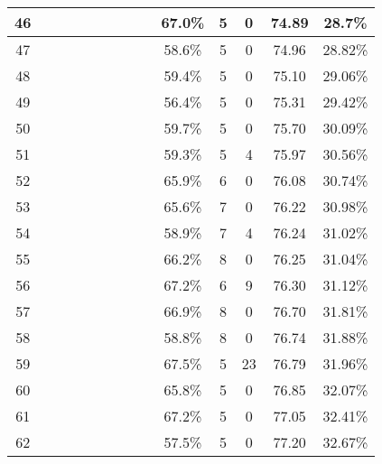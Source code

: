 \begin{longtable}{|c|c|c|c|c|c|c|c|c|c|c|c|c|c|}
46 &  \x    & \x    & \x    & \x    & \x\m  & \x    &       &       & 67.0\% &  5  & 0  & 74.89 & 28.7\% \\ \hline
47 &  \x    & \x    & \x    &       & \x    &       & \x    &       & 58.6\% &  5  & 0  & 74.96 & 28.82\% \\ \hline
48 &  \x    & \x    & \x    & \x    & \x    & \x    & \x    &       & 59.4\% &  5  & 0  & 75.10 & 29.06\% \\ \hline
49 &  \x    & \x    &       & \x    & \x    &       &       & \x    & 56.4\% &  5  & 0  & 75.31 & 29.42\% \\ \hline
50 &  \x    & \x    & \x    & \x    & \x    & \x    & \x\m  &       & 59.7\% &  5  & 0  & 75.70 & 30.09\% \\ \hline
51 &  \x    & \x    & \x    & \x    & \x    &       &       & \x\m  & 59.3\% &  5  & 4  & 75.97 & 30.56\% \\ \hline
52 &  \x    & \x    &       & \x    & \x\m  &       & \x\m  &       & 65.9\% &  6  & 0  & 76.08 & 30.74\% \\ \hline
53 &  \x    & \x    &       & \x    & \x\m  & \x\m  & \x\m  &       & 65.6\% &  7  & 0  & 76.22 & 30.98\% \\ \hline
54 &  \x    & \x    & \x    &       & \x    & \x\m  & \x    &       & 58.9\% &  7  & 4  & 76.24 & 31.02\% \\ \hline
55 &  \x    & \x    & \x    &       & \x\m  &       &       & \x\m  & 66.2\% &  8  & 0  & 76.25 & 31.04\% \\ \hline
56 &  \x    & \x    &       &       & \x\m  &       &       & \x\m  & 67.2\% &  6  & 9  & 76.30 & 31.12\% \\ \hline
57 &  \x    & \x    &       &       & \x\m  & \x\m  &       & \x\m  & 66.9\% &  8  & 0  & 76.70 & 31.81\% \\ \hline
58 &  \x    & \x    & \x    & \x    &       &       &       &       & 58.8\% &  8  & 0  & 76.74 & 31.88\% \\ \hline
59 &  \x    & \x    &       &       & \x\m  &       &       &       & 67.5\% &  5  & 23 & 76.79 & 31.96\% \\ \hline
60 &  \x    & \x    &       & \x    & \x\m  & \x\m  &       &       & 65.8\% &  5  & 0  & 76.85 & 32.07\% \\ \hline
61 &  \x    & \x    &       & \x    & \x\m  &       &       & \x\m  & 67.2\% &  5  & 0  & 77.05 & 32.41\% \\ \hline
62 &  \x    & \x    & \x    & \x    &       & \x    & \x    &       & 57.5\% &  5  & 0  & 77.20 & 32.67\% \\ \hline

\end{longtable}
